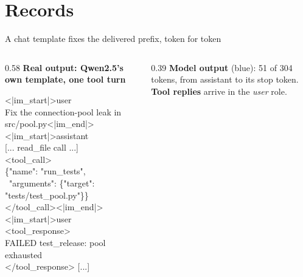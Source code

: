 \documentclass[aspectratio=169, 12pt]{beamer}
\newenvironment{logblock}[1][7.2]{\par\ttfamily\fontsize{#1}{\dimexpr #1pt*6/5\relax}\selectfont\raggedright\setlength{\parskip}{0pt}}{\par}
\begin{document}
\section{Records}

\begin{frame}{A chat template fixes the delivered prefix, token for token}
  \begin{columns}[T]
    \begin{column}{0.58\textwidth}
      {\footnotesize\textbf{Real output: Qwen2.5's own template, one tool turn}}\par\vspace{0.05cm}
      \begin{logblock}[8.5]
        <|im\_start|>user\\
        Fix the connection-pool leak in src/pool.py<|im\_end|>\\
        \colorbox{BlueLine!12}{\textcolor{BlueLine}{<|im\_start|>assistant}}\\
        \textcolor{midgray}{[... read\_file call ...]}\\
        \textcolor{BlueLine}{<tool\_call>}\\
        \textcolor{BlueLine}{\{"name": "run\_tests",}\\
        \textcolor{BlueLine}{\ "arguments": \{"target": "tests/test\_pool.py"\}\}}\\
        \textcolor{BlueLine}{</tool\_call>}\colorbox{BlueLine!12}{\textcolor{BlueLine}{<|im\_end|>}}\\
        \colorbox{OrangeLine!15}{\textcolor{OrangeLine}{<|im\_start|>user}}\\
        \textcolor{OrangeLine}{<tool\_response>}\\
        \textcolor{OrangeLine}{FAILED test\_release: pool exhausted}\\
        \textcolor{OrangeLine}{</tool\_response>}\textcolor{midgray}{ [...]}
      \end{logblock}
    \end{column}
    \begin{column}{0.39\textwidth}
      \footnotesize
      \textcolor{BlueLine}{\textbf{Model output}} (blue): 51 of 304 tokens, from \colorbox{BlueLine!12}{assistant} to \colorbox{BlueLine!12}{its stop token}.\\[0.12cm]
      \textcolor{OrangeLine}{\textbf{Tool replies}} arrive in the \colorbox{OrangeLine!15}{\emph{user} role}.\\[0.12cm]
      \\[0.18cm]

\end{column}
\end{columns}
\end{frame}
\end{document}
